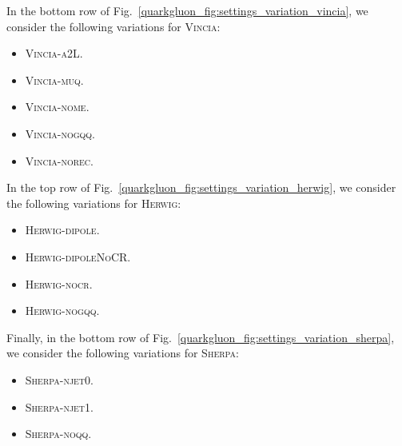 \documentclass[11pt]{cernrep}
\begin{document}
In the bottom row of Fig.~\ref{quarkgluon_fig:settings_variation_vincia}, we consider the following variations for  \textsc{Vincia}:
\begin{itemize}
\item \textsc{Vincia-a2L}.
\item \textsc{Vincia-muq}.
\item \textsc{Vincia-nome}.
\item \textsc{Vincia-nogqq}.
\item \textsc{Vincia-norec}.
\end{itemize}

In the top row of Fig.~\ref{quarkgluon_fig:settings_variation_herwig}, we consider the following variations for  \textsc{Herwig}:
\begin{itemize}
\item \textsc{Herwig-dipole}.
\item \textsc{Herwig-dipoleNoCR}.
\item \textsc{Herwig-nocr}.
\item \textsc{Herwig-nogqq}.
\end{itemize}

Finally, in the bottom row of Fig.~\ref{quarkgluon_fig:settings_variation_sherpa}, we consider the following variations for \textsc{Sherpa}:
\begin{itemize}
\item \textsc{Sherpa-njet0}.
\item \textsc{Sherpa-njet1}.
\item \textsc{Sherpa-noqq}.
\end{itemize}
\end{document}
